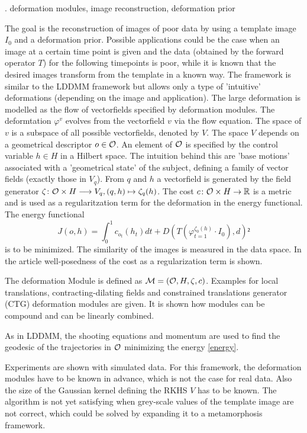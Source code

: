 
{\cite{Gris2018Incorporation}. deformation modules, image reconstruction, deformation prior}
{The goal is the reconstruction of images of poor data by using a template image $I_0$ and a deformation prior. Possible applications could be the case when an image at a certain time point is given and the data (obtained by the forward operator $T$) for the following timepoints is poor, while it is known that the desired images transform from the template in a known way.
	The framework is similar to the LDDMM framework but allows only a type of 'intuitive' deformations (depending on the image and application).	
	The large deformation is modelled as the flow of vectorfields specified by deformation modules. The deformtation $\varphi^v$ evolves from the vectorfield $v$ via the flow equation. The space of $v$ is a subspace of all possible vectorfields, denoted by $V$.
	The space $V$ depends on a geometrical descriptor $o\in\mathcal{O}$. An element of $\mathcal{O}$ is specified by the control variable $h\in H$ in a Hilbert space.
	The intuition behind this are 'base motions' associated with a 'geometrical state' of the subject, defining a family of vector fields (exactly those in $V_q$).
	From $q$ and $h$ a vectorfield is generated by the field generator $\zeta\colon \mathcal{O}\times H \longrightarrow V_q, (q,h)\mapsto \zeta_q(h)$.
	The cost $c\colon \mathcal{O}\times H\rightarrow \mathbb{R}$ is a metric and is used as a regularitzation term for the deformation in the energy functional.
	The energy functional 
	\begin{equation}
	J (o,h) = \int_{0}^{1} c_{o_t}(h_t) dt + D( T(\varphi^{\zeta_0(h)}_{t=1}\cdot I_0),d)²
	\label{energy}
	\end{equation}
	is to be minimized. The similarity of the images is measured in the data space.
	In the article well-posedness of the cost as a regularization term is shown.
	
	The deformation Module is defined as $\mathcal{M} = (\mathcal{O}, H, \zeta, c)$. Examples for local translations, contracting-dilating fields and constrained translations generator (CTG) deformation modules are given. It is shown how modules can be compound and can be linearly combined.
	
	As in LDDMM, the shooting equations and momentum are used to find the geodesic of the trajectories in $\mathcal{O}$ minimizing the energy \eqref{energy}.
	
	Experiments are shown with simulated data.
	For this framework, the deformation modules have to be known in advance, which is not the case for real data. Also the size of the Gaussian kernel defining the RKHS $V$ has to be known. 
	The algorithm is not yet satisfying when grey-scale values of the template image are not correct, which could be solved by expanding it to a metamorphosis framework.}